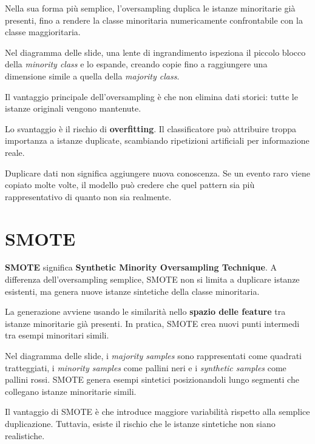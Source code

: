 Nella sua forma più semplice, l'oversampling duplica le istanze minoritarie già presenti, fino a rendere la classe minoritaria numericamente confrontabile con la classe maggioritaria.

\begin{notaslide}
Nel diagramma delle slide, una lente di ingrandimento ispeziona il piccolo blocco della \emph{minority class} e lo espande, creando copie fino a raggiungere una dimensione simile a quella della \emph{majority class}.
\end{notaslide}

Il vantaggio principale dell'oversampling è che non elimina dati storici: tutte le istanze originali vengono mantenute.

Lo svantaggio è il rischio di \textbf{overfitting}. Il classificatore può attribuire troppa importanza a istanze duplicate, scambiando ripetizioni artificiali per informazione reale.

\begin{notaprof}
Duplicare dati non significa aggiungere nuova conoscenza. Se un evento raro viene copiato molte volte, il modello può credere che quel pattern sia più rappresentativo di quanto non sia realmente.
\end{notaprof}

\section{SMOTE}

\textbf{SMOTE} significa \textbf{Synthetic Minority Oversampling Technique}. A differenza dell'oversampling semplice, SMOTE non si limita a duplicare istanze esistenti, ma genera nuove istanze sintetiche della classe minoritaria.

La generazione avviene usando le similarità nello \textbf{spazio delle feature} tra istanze minoritarie già presenti. In pratica, SMOTE crea nuovi punti intermedi tra esempi minoritari simili.

\begin{notaslide}
Nel diagramma delle slide, i \emph{majority samples} sono rappresentati come quadrati tratteggiati, i \emph{minority samples} come pallini neri e i \emph{synthetic samples} come pallini rossi. SMOTE genera esempi sintetici posizionandoli lungo segmenti che collegano istanze minoritarie simili.
\end{notaslide}

Il vantaggio di SMOTE è che introduce maggiore variabilità rispetto alla semplice duplicazione. Tuttavia, esiste il rischio che le istanze sintetiche non siano realistiche.

